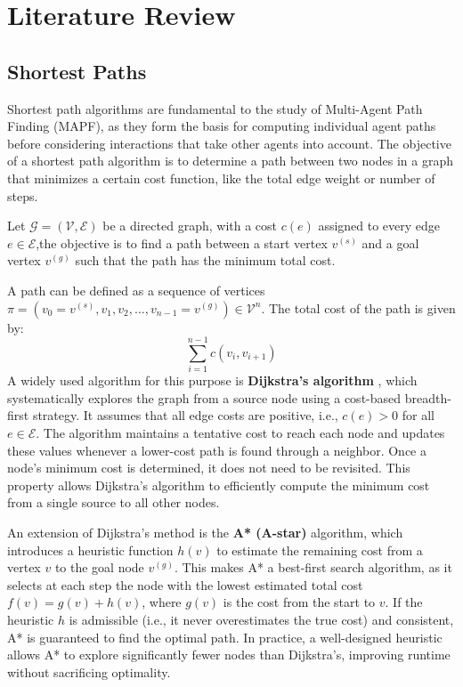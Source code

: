 \section{Literature Review}
\subsection{Shortest Paths}
Shortest path algorithms are fundamental to the study of Multi-Agent Path Finding (MAPF), as they form the basis for computing individual agent paths before considering interactions that take other agents into account. The objective of a shortest path algorithm is to determine a path between two nodes in a graph that minimizes a certain cost function, like the total edge weight or number of steps.

Let \( \mathcal{G} = (\mathcal{V}, \mathcal{E}) \) be a directed graph, with a cost \( c(e) \) assigned to every edge \( e \in \mathcal{E} \),the objective is to find a path between a start vertex \( v^{(s)} \) and a goal vertex \( v^{(g)} \) such that the path has the minimum total cost.

A path can be defined as a sequence of vertices \( \pi = (v_0 = v^{(s)}, v_1, v_2, \ldots, v_{n-1} = v^{(g)}) \in \mathcal{V}^n \). The total cost of the path is given by:
\[
\sum_{i=1}^{n-1} c(v_i, v_{i+1}) \tag{1}
\] 
A widely used algorithm for this purpose is \textbf{Dijkstra’s algorithm} \cite{dijkstraNoteTwoProblems1959}, which systematically explores the graph from a source node using a cost-based breadth-first strategy. It assumes that all edge costs are positive, i.e., \( c(e) > 0 \) for all \( e \in \mathcal{E} \). The algorithm maintains a tentative cost to reach each node and updates these values whenever a lower-cost path is found through a neighbor. Once a node's minimum cost is determined, it does not need to be revisited. This property allows Dijkstra’s algorithm to efficiently compute the minimum cost from a single source to all other nodes.

An extension of Dijkstra’s method is the \textbf{A* (A-star)} \cite{hartFormalBasisHeuristic1968} algorithm, which introduces a heuristic function \( h(v) \) to estimate the remaining cost from a vertex \( v \) to the goal node \( v^{(g)} \). This makes A* a best-first search algorithm, as it selects at each step the node with the lowest estimated total cost \( f(v) = g(v) + h(v) \), where \( g(v) \) is the cost from the start to \( v \). If the heuristic \( h \) is admissible (i.e., it never overestimates the true cost) and consistent, A* is guaranteed to find the optimal path. In practice, a well-designed heuristic allows A* to explore significantly fewer nodes than Dijkstra’s, improving runtime without sacrificing optimality. 

